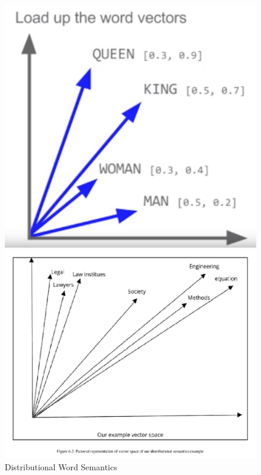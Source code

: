 \documentclass[a4paper, 12pt,notitlepage]{article} %
\newenvironment{figurecenter}{%
	\setlength\topsep{-7pt}
	\setlength\parskip{-7pt}
	\singlespacing %
	\begin{center}
	}{%
	\end{center}
\vspace{-5pt}
}
\numberwithin{dummy}{subsection}
\numberwithin{dummy}{section}
\theoremstyle{named}
\theoremstyle{definition}
\theoremstyle{definition}
\begin{document}
\begin{figure}[H]
	\begin{figurecenter}
	\begin{minipage}{.5\textwidth}
		\centering
		\includegraphics[scale=0.68]{image4.png}
	\end{minipage}%
	\begin{minipage}{.5\textwidth}
		\centering
		\includegraphics[scale=0.75]{image3.png}
	\end{minipage}
	\caption{Distributional Word Semantics \cite{kindqueen,pythonnlp}}
	\label{iota}
	\end{figurecenter}
\end{figure}
\end{document}
